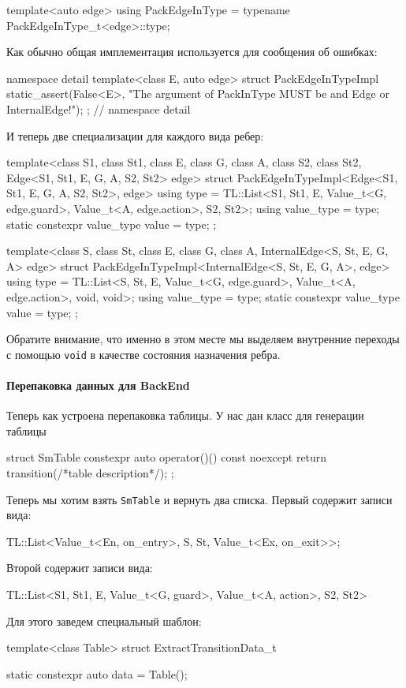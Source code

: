 \documentclass{article}
\begin{document}
{\begin{cppcode}
template<auto edge>
using PackEdgeInType = typename PackEdgeInType_t<edge>::type;
\end{cppcode}
Как обычно общая имплементация используется для сообщения об ошибках:
\begin{cppcode}
namespace detail {
template<class E, auto edge>
struct PackEdgeInTypeImpl {
  static_assert(False<E>, "The argument of PackInType MUST be and Edge or InternalEdge!");
};
} // namespace detail
\end{cppcode}
И теперь две специализации для каждого вида ребер:
\begin{cppcode}
template<class S1, class St1, class E, class G, class A, class S2, class St2,
         Edge<S1, St1, E, G, A, S2, St2> edge>
struct PackEdgeInTypeImpl<Edge<S1, St1, E, G, A, S2, St2>, edge> {
  using type = TL::List<S1, St1, E, Value_t<G, edge.guard>, Value_t<A, edge.action>, S2, St2>;
  using value_type = type;
  static constexpr value_type value = type{};
};

template<class S, class St, class E, class G, class A, InternalEdge<S, St, E, G, A> edge>
struct PackEdgeInTypeImpl<InternalEdge<S, St, E, G, A>, edge> {
  using type = TL::List<S, St, E, Value_t<G, edge.guard>, Value_t<A, edge.action>, void, void>;
  using value_type = type;
  static constexpr value_type value = type{};
};
\end{cppcode}
Обратите внимание, что именно в этом месте мы выделяем внутренние переходы с помощью \verb"void" в качестве состояния назначения ребра.

\paragraph{Перепаковка данных для BackEnd}

Теперь как устроена перепаковка таблицы.
У нас дан класс для генерации таблицы
\begin{cppcode}
struct SmTable {
  constexpr auto operator()() const noexcept {
    return transition(/*table description*/);
  }
};
\end{cppcode}
Теперь мы хотим взять \verb"SmTable" и вернуть два списка.
Первый содержит записи вида:
\begin{cppcode}
TL::List<Value_t<En, on_entry>, S, St, Value_t<Ex, on_exit>>;
\end{cppcode}
Второй содержит записи вида:
\begin{cppcode}
TL::List<S1, St1, E, Value_t<G, guard>, Value_t<A, action>, S2, St2>
\end{cppcode}
Для этого заведем специальный шаблон:
\begin{cppcode}
template<class Table>
struct ExtractTransitionData_t {
  static constexpr auto data = Table{}();

}
\end{cppcode}}
\end{document}
